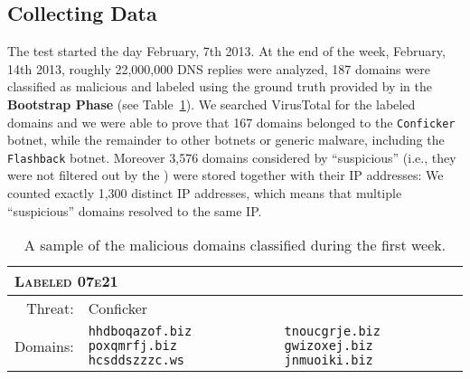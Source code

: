 \subsection{Collecting Data} %
\label{sub:collecting_data}
The test started the day February, 7th 2013. At the end of the week, February, 14th 2013,
roughly 22,000,000 DNS replies were analyzed, 187 domains were classified as malicious and
labeled using the ground truth provided by \phoenix in the \textbf{Bootstrap Phase} (see Table~\ref{tab:classified}). We searched VirusTotal for the labeled domains
and we were able to prove that
167 domains belonged to the \texttt{Conficker} botnet, while the remainder
to other botnets or generic malware, including the \texttt{Flashback} botnet.
Moreover 3,576 domains considered by \thesystem ``suspicious'' (i.e., they were
not filtered out by the ) were stored together
with their IP addresses: We counted exactly 1,300 distinct IP addresses, which
means that multiple ``suspicious'' domains resolved to the same IP.
\begin{table}[!htp]
\centering
\begin{tabular}{rp{2.8cm}p{2.8cm}}
\multicolumn{2}{l}{\textsc{Labeled 07e21}} & \\
\midrule
Threat: & Conficker  & \\
Domains: & \texttt{hhdboqazof.biz} \newline \texttt{poxqmrfj.biz} \newline \texttt{hcsddszzzc.ws} & \texttt{tnoucgrje.biz} \newline \texttt{gwizoxej.biz} \newline  \texttt{jnmuoiki.biz} \\
\end{tabular}
\caption{A sample of the malicious domains classified during the first week.}
\label{tab:classified}
\end{table}
